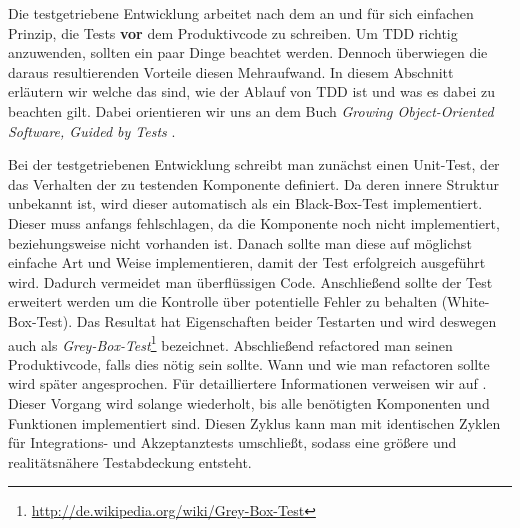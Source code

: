 Die testgetriebene Entwicklung arbeitet nach dem an und für sich einfachen Prinzip, die Tests \textbf{vor} dem Produktivcode zu schreiben. Um TDD richtig anzuwenden, sollten ein paar Dinge beachtet werden. Dennoch überwiegen die daraus resultierenden Vorteile diesen Mehraufwand. In diesem Abschnitt erläutern wir welche das sind, wie der Ablauf von TDD ist und was es dabei zu beachten gilt. Dabei orientieren wir uns an dem Buch \textit{Growing Object-Oriented Software, Guided by Tests} \cite{FRE10}.

Bei der testgetriebenen Entwicklung schreibt man zunächst einen Unit-Test, der das Verhalten der zu testenden Komponente definiert. Da deren innere Struktur unbekannt ist, wird dieser automatisch als ein Black-Box-Test implementiert. Dieser muss anfangs fehlschlagen, da die Komponente noch nicht implementiert, beziehungsweise nicht vorhanden ist. Danach sollte man diese auf möglichst einfache Art und Weise implementieren, damit der Test erfolgreich ausgeführt wird. Dadurch vermeidet man überflüssigen Code. Anschließend sollte der Test erweitert werden um die Kontrolle über potentielle Fehler zu behalten (White-Box-Test). Das Resultat hat Eigenschaften beider Testarten und wird deswegen auch als \textit{Grey-Box-Test}\footnote{\url{http://de.wikipedia.org/wiki/Grey-Box-Test}} bezeichnet. Abschließend refactored man seinen Produktivcode, falls dies nötig sein sollte. Wann und wie man refactoren sollte wird später angesprochen. Für detailliertere Informationen verweisen wir auf \cite{FOW99}.\\
Dieser Vorgang wird solange wiederholt, bis alle benötigten Komponenten und Funktionen implementiert sind. Diesen Zyklus kann man mit identischen Zyklen für Integrations- und Akzeptanztests umschließt, sodass eine größere und realitätsnähere Testabdeckung entsteht.

